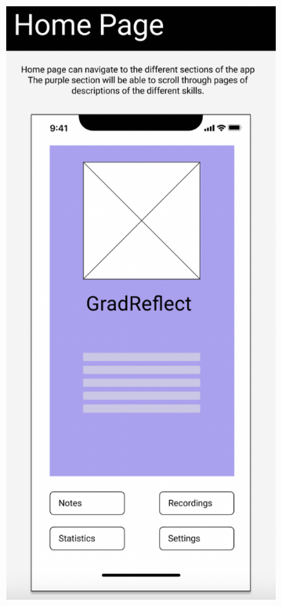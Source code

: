 \documentclass{l4proj}
\begin{document}
\begin{appendices}
\begin{figure}[H]
    \centering
    \begin{subfigure}[b]{0.3\textwidth}
        \includegraphics[scale=0.3]{images/HomeWireframe.pdf}

\end{subfigure}
\end{figure}
\end{appendices}
\end{document}
